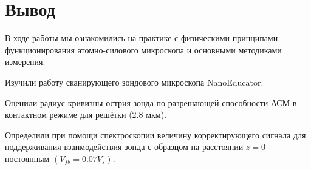 \documentclass[a4paper, 12pt]{article}
\begin{document}
	\section{Вывод}
	В ходе работы мы ознакомились на практике с физическими принципами функционирования атомно-силового микроскопа и основными методиками измерения.\par
	Изучили работу сканирующего зондового микроскопа NanoEducator.\par
	Оценили радиус кривизны острия зонда по разрешающей способности АСМ в контактном режиме для решётки (2.8 мкм).\par
	Определили при помощи спектроскопии величину корректирующего сигнала для поддерживания взаимодействия зонда с образцом на расстоянии $z = 0$ постоянным $(V_{fb} = 0.07V_s)$.
\end{document}
